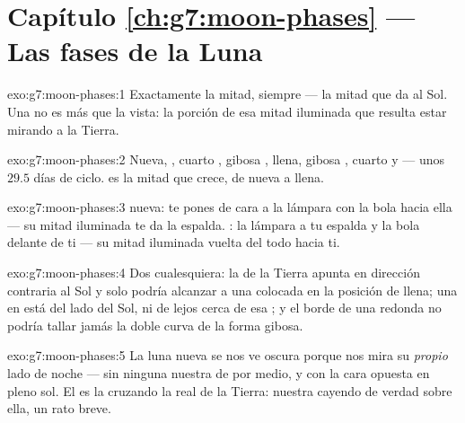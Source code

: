 \section*{Capítulo \ref{ch:g7:moon-phases} --- Las fases de la Luna}

\begin{solution}{exo:g7:moon-phases:1}
Exactamente la mitad, siempre --- la mitad que da al Sol. Una
 no es más que la vista: la porción de esa mitad iluminada que
resulta estar mirando a la Tierra.
\end{solution}

\begin{solution}{exo:g7:moon-phases:2}
Nueva, , cuarto , gibosa , llena,
gibosa , cuarto  y   ---
unos $29.5$ días de ciclo.  es la mitad que crece, de
nueva a llena.
\end{solution}

\begin{solution}{exo:g7:moon-phases:3}
 nueva: te pones de cara a la lámpara con la bola hacia ella ---
su mitad iluminada te da la espalda. : la lámpara a tu
espalda y la bola delante de ti --- su mitad iluminada vuelta del todo
hacia ti.
\end{solution}

\begin{solution}{exo:g7:moon-phases:4}
Dos cualesquiera: la  de la Tierra apunta en dirección
contraria al Sol y solo podría alcanzar a una  colocada en la
posición de llena; una  en  está del lado del Sol,
ni de lejos cerca de esa ; y el borde de una  redonda
no podría tallar jamás la doble curva de la forma gibosa.
\end{solution}

\begin{solution}{exo:g7:moon-phases:5}
La luna nueva se nos ve oscura porque nos mira su \emph{propio} lado de
noche --- sin ninguna  nuestra de por medio, y con la cara
opuesta en pleno sol. El  es la 
cruzando la  real de la Tierra: nuestra  cayendo de
verdad sobre ella, un rato breve.
\end{solution}

